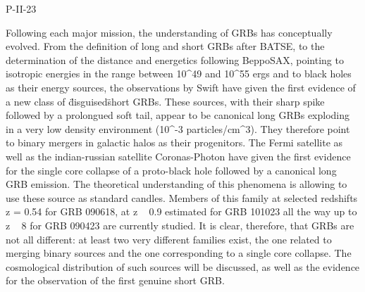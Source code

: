 P-II-23


\bigskip



\bigskip

\noindent Following each major mission, the understanding of GRBs has conceptually evolved. From the definition of long and short GRBs after BATSE, to the determination of the distance and energetics following BeppoSAX, pointing to isotropic energies in the range between 10^{49} and 10^{55} ergs and to black holes as their energy sources, the observations by Swift have given the first evidence of a new class of \"disguised\" short GRBs. These sources, with their sharp spike followed by a prolongued soft tail, appear to be canonical long GRBs exploding in a very low density environment (10^{-3} particles/cm^3). They therefore point to binary mergers in galactic halos as their progenitors. The Fermi satellite as well as the indian-russian satellite Coronas-Photon have given the first evidence for the single core collapse of a proto-black hole followed by a canonical long GRB emission. The theoretical understanding of this phenomena is allowing to use these source as standard candles. Members of this family at selected redshifts z = 0.54 for GRB 090618, at z ~ 0.9 estimated for GRB 101023 all the way up to z ~ 8 for GRB 090423 are currently studied. It is clear, therefore, that GRBs are not all different: at least two very different families exist, the one related to merging binary sources and the one corresponding to a single core collapse. The cosmological distribution of such sources will be discussed, as well as the evidence for the observation of the first genuine short GRB.

